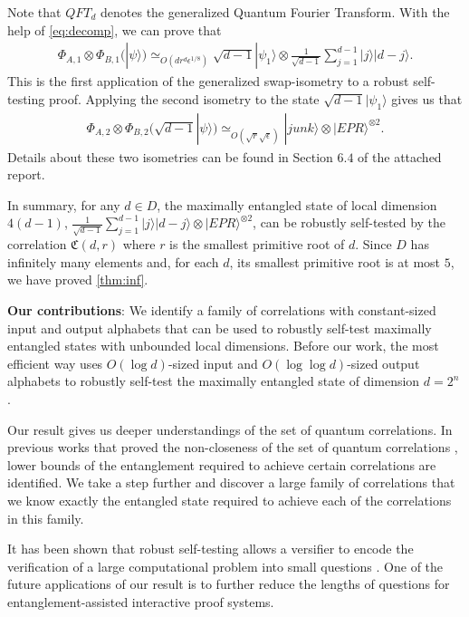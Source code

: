 \documentclass[11pt,letterpaper]{article}
\newcommand{\ket}[1]{|#1\rangle}
\newcommand{\x}{\otimes}
\newcommand{\1}{\mathbb{1}}
\newcommand{\fC}{\mathfrak{C}}
\newcommand{\ep}{\epsilon}
\newcommand{\se}{\sqrt{\epsilon}}
\newcommand{\sr}{\sqrt{r}}
\newcommand{\appd}[1]{\simeq_{#1}}
\theoremstyle{definition}
\begin{document}
Note that $QFT_d$ denotes the generalized Quantum Fourier Transform.
With the help of \cref{eq:decomp}, we can prove that
\begin{align*}
    \Phi_{A,1}\x\Phi_{B,1}(\ket{\psi}) \appd{O(d r^{d} \ep^{1/8})} \sqrt{d-1}\ket{\psi_1} \x \frac{1}{\sqrt{d-1}}\sum_{j=1}^{d-1} \ket{j}\ket{d-j}.
\end{align*}
This is the first application of the generalized swap-isometry \cite{yang2013} to a robust self-testing proof.  
Applying the second isometry to the state $\sqrt{d-1}\ket{\psi_1}$ gives us that
\begin{align*}
    \Phi_{A,2}\x\Phi_{B,2}(\sqrt{d-1}\ket{\psi})
    \appd{O(\sr \se)} \ket{junk} \x 
    \ket{EPR}^{\x 2}.
\end{align*}
Details about these two isometries can be found in
Section $6.4$ of the attached report.

In summary, 
for any $d \in D$, the maximally entangled state
of local dimension $4(d-1)$, $\frac{1}{\sqrt{d-1}} \sum_{j=1}^{d-1} \ket{j}\ket{d-j} \x \ket{EPR}^{\x 2}$, can be 
robustly self-tested by the correlation $\fC(d,r)$ 
where $r$ is the smallest primitive root of $d$.
Since $D$ has infinitely many elements and, for each $d$, 
its smallest primitive root is at most $5$, 
we have proved \cref{thm:inf}.


\textbf{Our contributions}:
We identify a family of correlations with constant-sized input and output alphabets that can be used to robustly self-test
maximally entangled states with unbounded local dimensions. Before our work, the most efficient way 
uses $O(\log d)$-sized input and $O(\log \log d)$-sized output alphabets to robustly self-test
the maximally entangled state of dimension $d = 2^n$ \cite{lowdegree}.  


Our result gives us deeper understandings of the set of quantum correlations.
In previous works that proved the non-closeness of the set of quantum correlations \cite{slofstra2017, slofstra2018}, 
lower bounds of the entanglement required to achieve certain correlations are identified.
We take a step further and discover a large family of correlations that we know exactly the entangled state
required to achieve each of the correlations in this family. 

It has been shown that robust self-testing allows a versifier to encode the verification of
a large computational problem into small questions \cite{fitzsimons2019,neexp}. One of the future applications of our result 
is to further reduce the lengths of questions for entanglement-assisted interactive proof systems.



\end{document}
